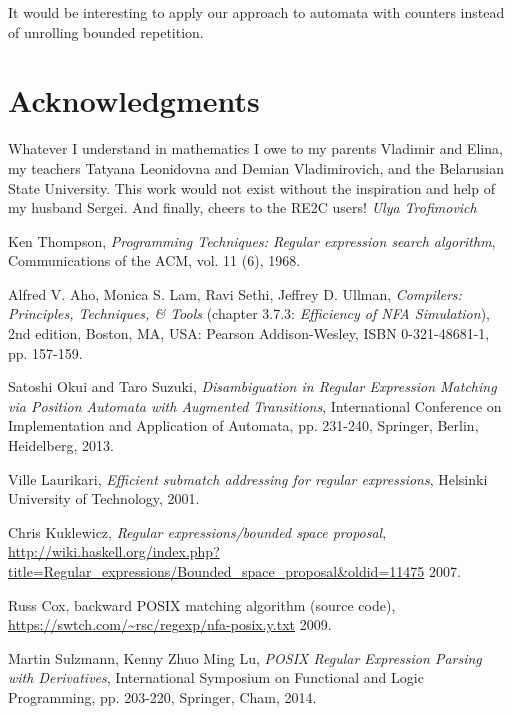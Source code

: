\documentclass[AMA,STIX1COL]{WileyNJD-v2}
\begin{document}
It would be interesting to apply our approach to automata with counters
instead of unrolling bounded repetition.


\section*{Acknowledgments}

Whatever I understand in mathematics I owe to my parents Vladimir and Elina,
my teachers Tatyana Leonidovna and Demian Vladimirovich, and the Belarusian State University.
This work would not exist without the inspiration and help of my husband Sergei.
And finally, cheers to the RE2C users!
\null\hfill\textit{Ulya Trofimovich}


\begin{thebibliography}{99}

    Ken Thompson,
    \textit{Programming Techniques: Regular expression search algorithm},
    Communications of the ACM,
    vol. 11 (6),
    1968.

    Alfred V. Aho, Monica S. Lam, Ravi Sethi, Jeffrey D. Ullman,
    \textit{Compilers: Principles, Techniques, \& Tools} (chapter 3.7.3: \textit{Efficiency of NFA Simulation}),
    2nd edition,
    Boston, MA, USA: Pearson Addison-Wesley,
    ISBN 0-321-48681-1,
    pp. 157-159.

    Satoshi Okui and Taro Suzuki,
    \textit{Disambiguation in Regular Expression Matching via Position Automata with Augmented Transitions},
    International Conference on Implementation and Application of Automata, pp. 231-240, Springer, Berlin, Heidelberg,
    2013.

    Ville Laurikari,
    \textit{Efficient submatch addressing for regular expressions},
    Helsinki University of Technology,
    2001.

    Chris Kuklewicz,
    \textit{Regular expressions/bounded space proposal},
    \url{http://wiki.haskell.org/index.php?title=Regular_expressions/Bounded_space_proposal&oldid=11475}
    2007.

    Russ Cox,
    backward POSIX matching algorithm (source code),
    \url{https://swtch.com/~rsc/regexp/nfa-posix.y.txt}
    2009.

    Martin Sulzmann, Kenny Zhuo Ming Lu,
    \textit{POSIX Regular Expression Parsing with Derivatives},
    International Symposium on Functional and Logic Programming, pp. 203-220, Springer, Cham,
    2014.


\end{thebibliography}
\end{document}

